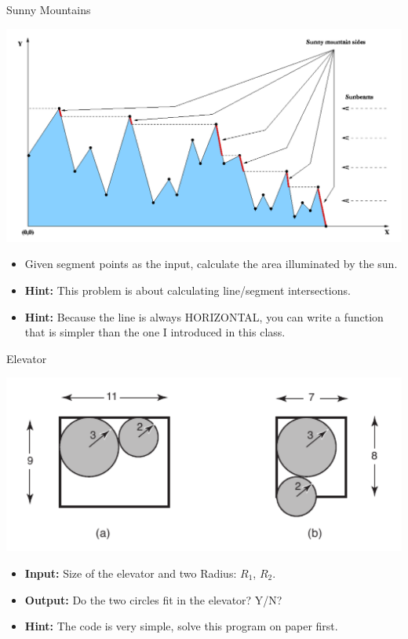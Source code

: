 \begin{frame}{Sunny Mountains}
  \begin{center}
    \includegraphics[width=.5\textwidth]{../img/problem_sunnyside}
  \end{center}
  \begin{itemize}
    \item Given segment points as the input, calculate the area illuminated by the sun.\bigskip

    \item {\bf Hint:} This problem is about calculating line/segment intersections.
    \item {\bf Hint:} Because the line is always HORIZONTAL, you can write a function that is simpler than the one I introduced in this class.
  \end{itemize}
\end{frame}

\begin{frame}{Elevator}
  \begin{center}
    \includegraphics[width=.7\textwidth]{../img/problem_elevator}
  \end{center}
  \begin{itemize}
    \item {\bf Input:} Size of the elevator and two Radius: $R_1$, $R_2$.
    \item {\bf Output:} Do the two circles fit in the elevator? Y/N?
    \item {\bf Hint:} The code is very simple, solve this program on paper first.
  \end{itemize}
\end{frame}

